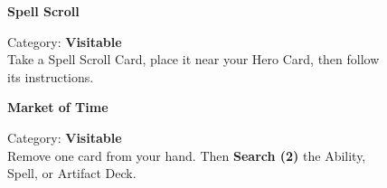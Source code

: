 \begin{figure}[H]
  \begin{minipage}[t]{0.47\textwidth}
    \vspace{0pt}
    \centering
    \textbf{Spell Scroll}\par
    \caption{\small Category: \textbf{Visitable}\\
      Take a Spell Scroll Card, place it near your Hero Card, then follow its instructions.
    }
  \end{minipage}\hfill
  \begin{minipage}[t]{0.47\textwidth}
    \vspace{0pt}
    \centering
    \phantom{j}\textbf{Market of Time}\phantom{j}\par
    \caption{\small Category: \textbf{Visitable}\\ Remove one card from your hand.
      Then \textbf{Search (2)} the Ability, Spell, or Artifact Deck.
    }
  \end{minipage}
\end{figure}


